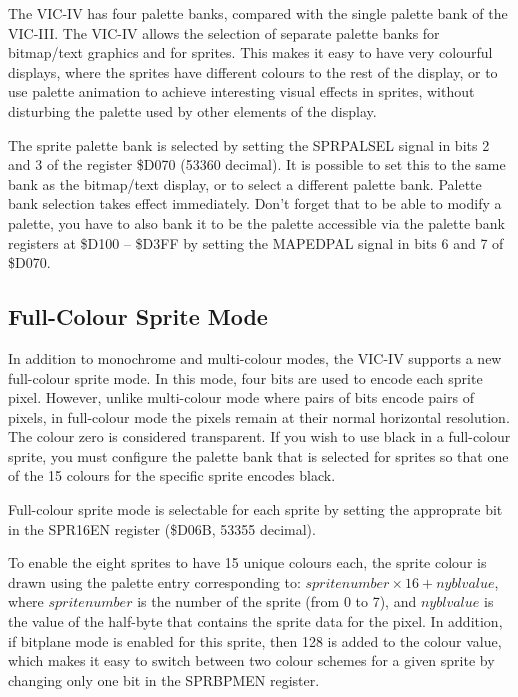 The VIC-IV has four palette banks, compared with the single palette bank of the VIC-III.
The VIC-IV allows the selection of separate palette banks for bitmap/text graphics and for sprites.  This makes it easy to have
very colourful displays, where the sprites have different colours to the rest of the display, or to use palette animation to achieve
interesting visual effects in sprites, without disturbing the palette used by other elements of the display.

The sprite palette bank is selected by setting the SPRPALSEL signal in bits 2 and 3 of the register \$D070 (53360 decimal).
It is possible to set this to the same bank as the bitmap/text display, or to select a different palette bank.
Palette bank selection takes effect immediately.  Don't forget that to be able to modify a palette, you have to also bank it
to be the palette accessible via the palette bank registers at \$D100 -- \$D3FF by setting the MAPEDPAL signal in bits 6 and 7 of
\$D070.

\subsection{Full-Colour Sprite Mode}

In addition to monochrome and multi-colour modes, the VIC-IV supports a new full-colour sprite mode.  In this mode, four bits are used to
encode each sprite pixel.  However, unlike multi-colour mode where pairs of bits encode pairs of pixels, in full-colour mode the pixels
remain at their normal horizontal resolution.  The colour zero is considered transparent. If you wish to use black in a full-colour sprite, you must configure the palette bank that is selected for sprites so that one of the 15 colours for the specific sprite encodes black.

Full-colour sprite mode is selectable for each sprite by setting the approprate bit in the SPR16EN register (\$D06B, 53355 decimal).

To enable the eight sprites to have 15 unique colours each, the sprite colour is drawn using the palette entry corresponding to:
$sprite number \times 16 + nybl value$, where $sprite number$ is the number of the sprite (from 0 to 7), and $nybl value$ is the value
of the half-byte that contains the sprite data for the pixel.  In addition, if bitplane mode is enabled for this sprite, then 128 is
added to the colour value, which makes it easy to switch between two colour schemes for a given sprite by changing only one bit in the
SPRBPMEN register.  

